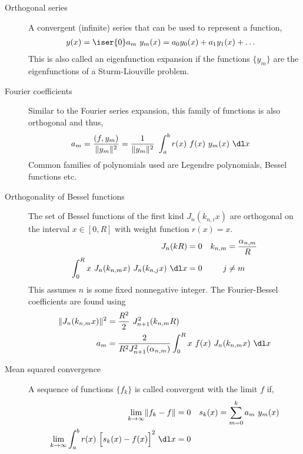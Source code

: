 \begin{description}
    \item[Orthogonal series] A convergent (infinite) series that can be used to
        represent a function,
        \begin{align}
            y(x) & = \iser{0} a_m\ y_m(x) = a_0 y_0(x) + a_1 y_1(x) + \dots
        \end{align}
        This is also called an eigenfunction expansion if the functions $ \{y_m\} $
        are the eigenfunctions of a Sturm-Liouville problem.

    \item[Fourier coefficients] Similar to the Fourier series expansion, this family
        of functions is also orthogonal and thus,
        \begin{align}
            a_m & = \frac{(f, y_m)}{\lVert y_m \rVert^2}
            = \frac{1}{\lVert y_m \rVert^2}\ \int_{a}^{b} r(x)\ f(x)\ y_m(x)\ \dl x
        \end{align}
        Common families of polynomials used are Legendre polynomials, Bessel functions
        etc.

    \item[Orthogonality of Bessel functions] The set of Bessel functions of the first
        kind $ J_n (k_{n, i}x) $ are orthogonal on the interval $ x \in [0, R] $ with
        weight function $ r(x) = x $.
        \begin{align}
            J_n(kR) & = 0                        &
            k_{n,m} & =  \frac{\alpha_{n, m}}{R}   \\
            \int_{0}^{R} x\ J_n(k_{n,m}x)\ J_n(k_{n, j}x)
            \ \dl x & = 0                        &
            j       & \neq m
        \end{align}
        This assumes $ n $ is some fixed nonnegative integer. The Fourier-Bessel
        coefficients are found using
        \begin{align}
            \lVert J_n(k_{n,m}x) \rVert^2 & = \frac{R^2}{2}\ J^2_{n+1}(k_{n,m}R)   \\
            a_m                           & = \frac{2}{R^2J^2_{n+1}(\alpha_{n,m})}
            \int_{0}^{R} x\ f(x)\ J_n(k_{n,m}x)\ \dl x
        \end{align}

    \item[Mean squared convergence] A sequence of functions $ \{f_k\} $ is called
        convergent with the limit $ f $ if,
        \begin{align}
            \lim_{k \to \infty} \lVert f_k - f \rVert & = 0              &
            s_k(x)                                    & = \sum_{m=0}^{k}
            a_m\ y_m(x)                                                    \\
            \lim_{k \to \infty} \int_{a}^{b} r(x)\
            \Big[ s_k(x) - f(x) \Big]^2\ \dl x        & = 0
        \end{align}


\end{description}
